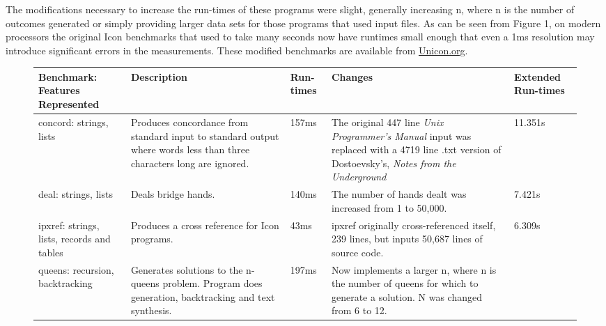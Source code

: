 \documentclass[letterpaper,12pt]{article}
\begin{document}
The modifications necessary to increase the run-times of these
programs were slight, generally increasing n, where n is the number of
outcomes generated or simply providing larger data sets for those
programs that used input files. As can be seen from Figure 1, on
modern processors the original Icon benchmarks that used to take many
seconds now have runtimes small enough that even a 1ms resolution may
introduce significant errors in the measurements. These modified
benchmarks are available from \url{Unicon.org}.

\newpage

\begin{figure}[h]
  \begin{center}
    {\footnotesize
      \begin{tabular}{ | p{2cm} | p{4cm} | p{.8cm} | p{5cm} | p{1.5cm} |}
        \hline
        Benchmark: Features Represented & 
        Description & 
        Run-times & 
        Changes &
        Extended Run-times
        \\ \hline
        concord: strings, lists & 
        Produces concordance from standard input to standard output 
        where words less than three characters long are ignored. &
        157ms &
        The original 447 line 
        \textit{Unix Programmer's Manual} input was replaced 
        with a 4719 line .txt version 
        of Dostoevsky's, \textit{Notes from the Underground} & 
        11.351s
        \\ \hline
        deal: strings, lists &  
        Deals bridge hands. & 
        140ms &  
        The number of hands dealt was increased from 1 to 50,000. & 
        7.421s  
        \\ \hline
        ipxref: strings, lists, records and tables &  
        Produces a cross reference for Icon programs. \cite{griswold:newsletter} & 
        43ms & 
        ipxref originally cross-referenced itself, 239 lines, 
        but inputs 50,687 lines of source code\cite{jeffery:sesrit}. &
        6.309s 
        \\ \hline
        queens: recursion, backtracking &  
        Generates solutions to the n-queens problem. 
        Program does generation, backtracking and text synthesis. \cite{griswold:newsletter} & 
        197ms &
        Now implements a larger n, where n is the number of 
        queens for which to generate a solution. N was changed from 6 to 12. & 

\end{tabular}}
\end{center}
\end{figure}
\end{document}
